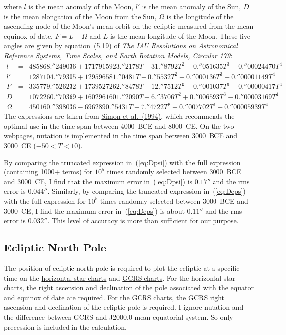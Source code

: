 \documentclass[12pt]{article}
\newcommand \beqn {\begin{eqnarray}}
\newcommand \eeqn {\end{eqnarray}}
\newcommand{\kaplan}{\href{https://arxiv.org/abs/astro-ph/0602086}{\it The IAU Resolutions on Astronomical Reference Systems, Time Scales, and Earth Rotation Models, Circular 179}}
\begin{document}
where $l$ is the mean anomaly of the Moon, $l'$ is the mean anomaly of the Sun, 
$D$ is the mean elongation of the Moon from the Sun, $\Omega$ is the longitude of 
the ascending node of the Moon's mean orbit on the ecliptic measured from the mean 
equinox of date, $F=L-\Omega$ and $L$ is the mean longitude of the Moon. These 
five angles are given by equation~(5.19) of \kaplan:
\beqn
  l &=& 485868.''249036 + 1717915923.''2178 T + 31.''8792 T^2 
+ 0.''051635 T^3 - 0.''00024470 T^4 \ \ \ \ \\ 
 l' &=& 1287104.''79305 + 129596581.''0481 T - 0.''5532 T^2 
+ 0.''000136 T^3 - 0.''00001149 T^4 \\ 
  F &=& 335779.''526232 + 1739527262.''8478 T - 12.''7512 T^2 
- 0.''001037 T^3 + 0.''00000417 T^4 \\
  D &=& 1072260.''70369 + 1602961601.''2090 T - 6.''3706 T^2 + 0.''006593 T^3 
- 0.''00003169 T^4 \\ 
  \Omega &=& 450160.''398036 - 6962890.''5431 T + 7.''4722 T^2 
+ 0.''007702 T^3 - 0.''00005939 T^4
\eeqn
The expressions are taken from \href{https://ui.adsabs.harvard.edu/abs/1994A%26A...282..663S/abstract}
{Simon et al.\ (1994)}, which recommends the optimal use in the time span between 
4000~BCE and 8000~CE. On the two webpages, nutation is implemented in the time span 
between 3000~BCE and 3000~CE ($-50 < T < 10$).

By comparing the truncated expression in~(\ref{eq:Dpsi}) with the full
expression (containing 1000+ terms) for $10^5$ times randomly selected 
between 3000~BCE and 3000~CE, 
I find that the maximum error in~(\ref{eq:Dpsi})
is $0.17''$ and the rms error is $0.044''$.  Similarly, by comparing the truncated
expression in~(\ref{eq:Deps}) with the full expression
for $10^5$ times randomly selected between 3000~BCE and 3000~CE, 
I find the maximum error in~(\ref{eq:Deps}) is about $0.11''$ and
the rms error is $0.032''$. This level of accuracy is more than sufficient 
for our purpose.

\subsection{Ecliptic North Pole}

The position of ecliptic north pole is required to plot the ecliptic 
at a specific time on the \href{../sidereal.html}{horizontal star charts} 
and \href{../chartGCRS.html}{GCRS charts}. For the horizontal star charts, 
the right ascension and declination of the pole associated with the 
equator and equinox of date are required. For the GCRS charts, the GCRS 
right ascension and declination of the ecliptic pole is required. I ignore 
nutation and the difference between GCRS and J2000.0 mean equatorial system. 
So only precession is included in the calculation.
\end{document}
